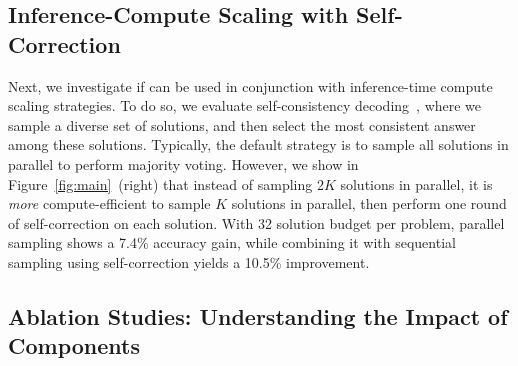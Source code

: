 \vspace{-0.2cm}
\subsection{Inference-Compute Scaling with Self-Correction}
\label{sec:inference}
\vspace{-0.2cm}
Next, we investigate if \methodname{} can be used in conjunction with inference-time compute scaling strategies. To do so, we evaluate self-consistency decoding~\citep{wang2022self}, where we sample a diverse set of solutions, and then select the most consistent answer among these solutions. Typically, the default strategy is to sample all solutions in parallel to perform majority voting. However, we show in Figure~\ref{fig:main}~(right) that instead of sampling $2K$ solutions in parallel, it is \emph{more} compute-efficient to sample $K$ solutions in parallel, then perform one round of self-correction on each solution. With 32 solution budget per problem, parallel sampling shows a 7.4\% accuracy gain, while combining it with sequential sampling using self-correction yields a 10.5\% improvement.

\vspace{-0.2cm}
\subsection{Ablation Studies: Understanding the Impact of \methodname{} Components}
\vspace{-0.1cm}

